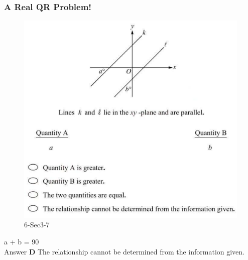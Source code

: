 \documentclass[
	11pt, %
	handout,
]{beamer}
\begin{document}

\begin{frame}
	\frametitle{A Real QR Problem!}


	\begin{figure}
		\includegraphics[width=0.5\linewidth]{Parallel_Slopes_Example_Question1.png}
		\caption{6-Sec3-7}
	\end{figure}
	\pause
a  \textdegree+ b  \textdegree= 90 \textdegree   \\
\pause
\bigskip
Answer \textbf{D } The relationship cannot be determined from the information given.
\end{frame}

\end{document}
